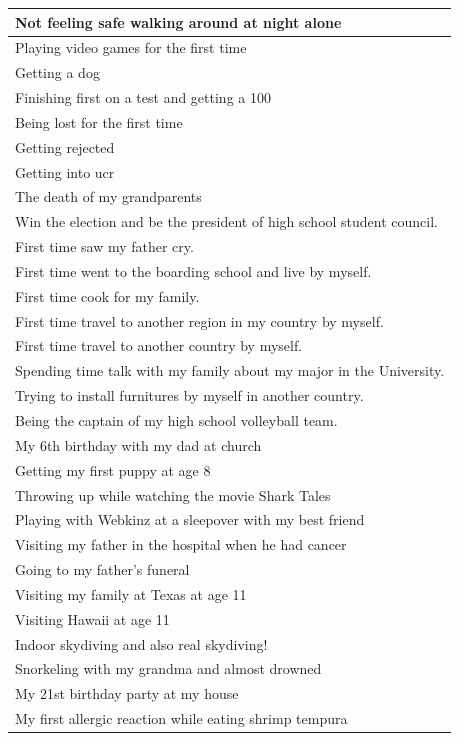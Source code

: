 \documentclass[
  .7em,
  letterpaper,
  DIV=11,
  numbers=noendperiod]{scrartcl}
\begin{document}
\begin{table}
\begin{tabular}{l}
\hline
Not feeling safe walking around at night alone\\
\hline
Playing video games for the first time\\
\hline
Getting a dog\\
\hline
Finishing first on a test and getting a 100\\
\hline
Being lost for the first time\\
\hline
Getting rejected\\
\hline
Getting into ucr\\
\hline
The death of my grandparents\\
\hline
Win the election and be the president of high school student council.\\
\hline
First time saw my father cry.\\
\hline
First time went to the boarding school and live by myself.\\
\hline
First time cook for my family.\\
\hline
First time travel to another region in my country by myself.\\
\hline
First time travel to another country by myself.\\
\hline
Spending time talk with my family about my major in the University.\\
\hline
Trying to install furnitures by myself in another country.\\
\hline
Being the captain of my high school volleyball team.\\
\hline
My 6th birthday with my dad at church\\
\hline
Getting my first puppy at age 8\\
\hline
Throwing up while watching the movie Shark Tales\\
\hline
Playing with Webkinz at a sleepover with my best friend\\
\hline
Visiting my father in the hospital when he had cancer\\
\hline
Going to my father's funeral\\
\hline
Visiting my family at Texas at age 11\\
\hline
Visiting Hawaii at age 11\\
\hline
Indoor skydiving and also real skydiving!\\
\hline
Snorkeling with my grandma and almost drowned\\
\hline
My 21st birthday party at my house\\
\hline
My first allergic reaction while eating shrimp tempura\\

\end{tabular}
\end{table}
\end{document}
